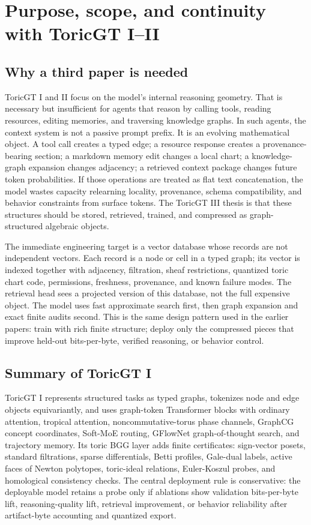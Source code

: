 \documentclass[11pt]{article}
\numberwithin{equation}{section}
\begin{document}
\section{Purpose, scope, and continuity with ToricGT I--II}
\subsection{Why a third paper is needed}
ToricGT I and II focus on the model's internal reasoning geometry. That is necessary but insufficient for agents that reason by calling tools, reading resources, editing memories, and traversing knowledge graphs. In such agents, the context system is not a passive prompt prefix. It is an evolving mathematical object. A tool call creates a typed edge; a resource response creates a provenance-bearing section; a markdown memory edit changes a local chart; a knowledge-graph expansion changes adjacency; a retrieved context package changes future token probabilities. If those operations are treated as flat text concatenation, the model wastes capacity relearning locality, provenance, schema compatibility, and behavior constraints from surface tokens. The ToricGT III thesis is that these structures should be stored, retrieved, trained, and compressed as graph-structured algebraic objects.

The immediate engineering target is a vector database whose records are not independent vectors. Each record is a node or cell in a typed graph; its vector is indexed together with adjacency, filtration, sheaf restrictions, quantized toric chart code, permissions, freshness, provenance, and known failure modes. The retrieval head sees a projected version of this database, not the full expensive object. The model uses fast approximate search first, then graph expansion and exact finite audits second. This is the same design pattern used in the earlier papers: train with rich finite structure; deploy only the compressed pieces that improve held-out bits-per-byte, verified reasoning, or behavior control.

\subsection{Summary of ToricGT I}
ToricGT I represents structured tasks as typed graphs, tokenizes node and edge objects equivariantly, and uses graph-token Transformer blocks with ordinary attention, tropical attention, noncommutative-torus phase channels, GraphCG concept coordinates, Soft-MoE routing, GFlowNet graph-of-thought search, and trajectory memory. Its toric BGG layer adds finite certificates: sign-vector posets, standard filtrations, sparse differentials, Betti profiles, Gale-dual labels, active faces of Newton polytopes, toric-ideal relations, Euler-Koszul probes, and homological consistency checks. The central deployment rule is conservative: the deployable model retains a probe only if ablations show validation bits-per-byte lift, reasoning-quality lift, retrieval improvement, or behavior reliability after artifact-byte accounting and quantized export.
\end{document}

